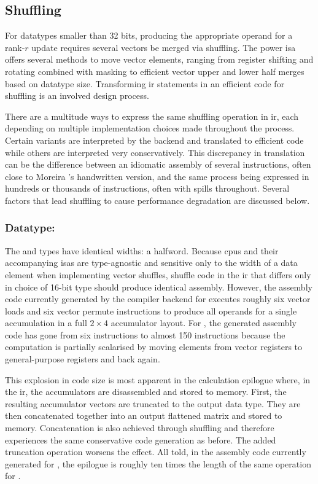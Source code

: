 \documentclass[\main/thesis.tex]{subfiles}
\begin{document}
\subsection{Shuffling}
For datatypes smaller than 32 bits, producing the appropriate operand for a rank-$r$ update requires several vectors be merged via shuffling.
The \gls{power} \gls{isa} offers several methods to move vector elements, ranging from register shifting and rotating combined with masking to efficient vector upper and lower half merges based on datatype size.
Transforming \gls{ir} statements in an efficient code for shuffling is an involved design process.

There are a multitude ways to express the same shuffling operation in \gls{ir}, each depending on multiple implementation choices made throughout the process.
Certain variants are interpreted by the backend and translated to efficient code while others are interpreted very conservatively.
This discrepancy in translation can be the difference between an idiomatic assembly of several instructions, often close to Moreira \etal's handwritten version, and the same process being expressed in hundreds or thousands of instructions, often with \glspl{spill} throughout.
Several factors that lead shuffling to cause performance degradation are discussed below.

\subsubsection{Datatype: \texorpdfstring{}{half}}
\label{sec:halfShuffle}
The  and  types have identical widths: a halfword.
Because \glspl{cpu} and their accompanying \glspl{isa} are type-agnostic and sensitive only to the width of a data element when implementing vector shuffles, shuffle code in the \gls{ir} that differs only in choice of 16-bit type should produce identical assembly.
However, the assembly code currently generated by the compiler backend for  executes roughly six vector loads and six vector permute instructions to produce all operands for a single accumulation in a full $2 \times 4$ accumulator layout.
For , the generated assembly code has gone from six instructions to almost 150 instructions because the computation is partially scalarised by moving elements from vector registers to general-purpose registers and back again.

This explosion in code size is most apparent in the calculation epilogue where, in the \gls{ir}, the accumulators are disassembled and stored to memory.
First, the resulting accumulator vectors are truncated to the output data type.
They are then concatenated together into an output flattened matrix and stored to memory.
Concatenation is also achieved through shuffling and therefore experiences the same conservative code generation as before.
The added truncation operation worsens the effect.
All told, in the assembly code currently generated for , the epilogue is roughly ten times the length of the same operation for .
\end{document}
